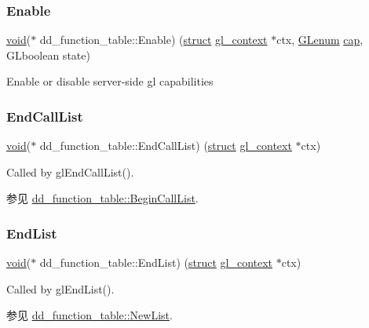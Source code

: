 \subsubsection{\texorpdfstring{Enable}{Enable}}
{\footnotesize\ttfamily \hyperlink{interfacevoid}{void}($\ast$ dd\+\_\+function\+\_\+table\+::\+Enable) (\hyperlink{interfacestruct}{struct} \hyperlink{structgl__context}{gl\+\_\+context} $\ast$ctx, \hyperlink{interfacevoid}{G\+Lenum} \hyperlink{interfacevoid}{cap}, G\+Lboolean state)}

Enable or disable server-\/side gl capabilities \mbox{\label{structdd__function__table_aa3a6bf7d319a558b88733fb71e7b4f6e}} 
\subsubsection{\texorpdfstring{End\+Call\+List}{EndCallList}}
{\footnotesize\ttfamily \hyperlink{interfacevoid}{void}($\ast$ dd\+\_\+function\+\_\+table\+::\+End\+Call\+List) (\hyperlink{interfacestruct}{struct} \hyperlink{structgl__context}{gl\+\_\+context} $\ast$ctx)}

Called by gl\+End\+Call\+List().

\begin{DoxySeeAlso}{参见}
\hyperlink{structdd__function__table_aefd7eee06c86ee7548b6648fb970369e}{dd\+\_\+function\+\_\+table\+::\+Begin\+Call\+List}. 
\end{DoxySeeAlso}
\mbox{\label{structdd__function__table_ab5c8edfc3ba9a6b3ff4dcfee53e4a2b9}} 
\subsubsection{\texorpdfstring{End\+List}{EndList}}
{\footnotesize\ttfamily \hyperlink{interfacevoid}{void}($\ast$ dd\+\_\+function\+\_\+table\+::\+End\+List) (\hyperlink{interfacestruct}{struct} \hyperlink{structgl__context}{gl\+\_\+context} $\ast$ctx)}

Called by gl\+End\+List().

\begin{DoxySeeAlso}{参见}
\hyperlink{structdd__function__table_a4fb10c66063fa5b3c6b98d4c9fc38b39}{dd\+\_\+function\+\_\+table\+::\+New\+List}. 
\end{DoxySeeAlso}
\mbox{\label{structdd__function__table_abc8c0b95063ce845d9e26d53b370e02c}} 
